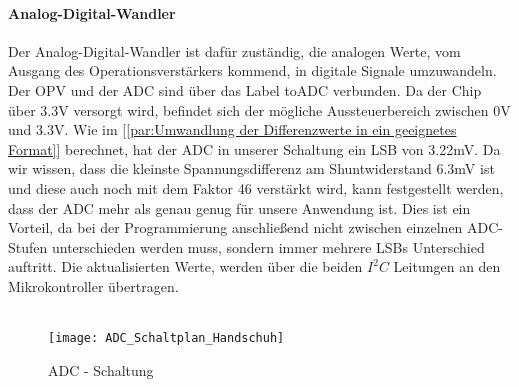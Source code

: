 \documentclass[titlepage,12pt,twoside]{article}
\begin{document}
\paragraph{Analog-Digital-Wandler}
\hfill \break
\hfill \break
Der Analog-Digital-Wandler ist dafür zuständig, die analogen Werte, vom Ausgang des Operationsverstärkers kommend, in digitale 
Signale umzuwandeln. Der OPV und der ADC sind über das Label toADC verbunden. Da der Chip über 3.3V versorgt wird, befindet
sich der mögliche Aussteuerbereich zwischen 0V und 3.3V. Wie im [\textcolor{blue}{\autoref{par:Umwandlung der Differenzwerte in ein geeignetes Format}}] berechnet, 
hat der ADC in unserer Schaltung ein LSB von 3.22mV. Da wir wissen, dass die kleinste Spannungsdifferenz am Shuntwiderstand 6.3mV
ist und diese auch noch mit dem Faktor 46 verstärkt wird, kann festgestellt werden, dass der ADC mehr als genau genug für unsere
Anwendung ist. Dies ist ein Vorteil, da bei der Programmierung anschließend nicht zwischen einzelnen ADC-Stufen unterschieden werden
muss, sondern immer mehrere LSBs Unterschied auftritt. Die aktualisierten Werte, werden über die beiden $I^{2}C$ Leitungen an den 
Mikrokontroller übertragen. \\
\\
\begin{figure}[H]
	\begin{center}
		\scalebox{0.5}
		{\texttt{[image: ADC\_Schaltplan\_Handschuh]}}
		\caption{ADC - Schaltung}
		\label{fig:ADC_Schaltplan_Handschuh}	
	\end{center}
\end{figure}
\end{document}
